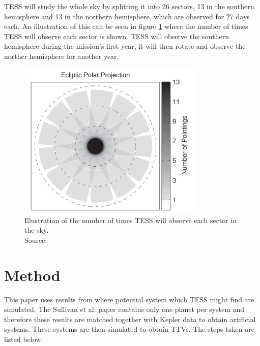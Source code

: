 \documentclass[12pt]{report}
\begin{document}
	TESS will study the whole sky by splitting it into 26 sectors, 13 in the southern hemisphere and 13 in the northern hemisphere, which are observed for 27 days each. An illustration of this can be seen in figure \ref{fig:tess_time} where the number of times TESS will observe each sector is shown. TESS will observe the southern hemisphere during the mission's first year, it will then rotate and observe the norther hemisphere for another year.
	\begin{figure}[h!]
	\centering
		\includegraphics[width=0.8\textwidth]{img/tess_observe_time.png}
		\caption{Illustration of the number of times TESS will observe each sector in the sky.\\ \small{Source: \cite{2015ApJ...809...77S}}}
		\label{fig:tess_time}
	\end{figure}	
	
\chapter{Method}
	This paper uses results from \cite{2015ApJ...809...77S} where potential system which TESS might find are simulated. The Sullivan et al. paper contains only one planet per system and therefore these results are matched together with Kepler data to obtain artificial systems. These systems are then simulated to obtain TTVs. The steps taken are listed below:
	
\end{document}
